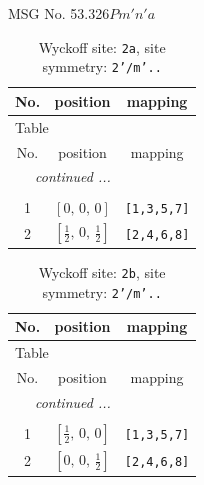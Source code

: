 \documentclass[fleqn,8pt]{jsarticle}
\begin{document}
\setcounter{MaxMatrixCols}{32}

\renewcommand{\tablename}{Table~}
\renewcommand{\figurename}{Figure~}
\begin{center}
\LARGE
MSG No. 53.326\quad$Pm'n'a$
\end{center}
\renewcommand{\arraystretch}{1.2}
\begin{longtable}{ccc}
\caption{Wyckoff site: {\tt 2a}, site symmetry: {\tt 2'/m'..}}
 \\
 \hline \hline
No. & position & mapping \\ \hline \endfirsthead

\multicolumn{2}{l}{\tablename\ \thetable{}} \\
 \hline \hline
No. & position & mapping \\ \hline \endhead

 \hline \hline
\multicolumn{2}{r}{\footnotesize\it continued ...} \\ \endfoot

 \hline \hline
\multicolumn{2}{r}{} \\ \endlastfoot

1 & $\left[ 0,\, 0,\, 0 \right]$ & {\tt [1,3,5,7]} \\ \hline
2 & $\left[ \frac{1}{2},\, 0,\, \frac{1}{2} \right]$ & {\tt [2,4,6,8]} \\
\end{longtable}
\renewcommand{\arraystretch}{1.2}
\begin{longtable}{ccc}
\caption{Wyckoff site: {\tt 2b}, site symmetry: {\tt 2'/m'..}}
 \\
 \hline \hline
No. & position & mapping \\ \hline \endfirsthead

\multicolumn{2}{l}{\tablename\ \thetable{}} \\
 \hline \hline
No. & position & mapping \\ \hline \endhead

 \hline \hline
\multicolumn{2}{r}{\footnotesize\it continued ...} \\ \endfoot

 \hline \hline
\multicolumn{2}{r}{} \\ \endlastfoot

1 & $\left[ \frac{1}{2},\, 0,\, 0 \right]$ & {\tt [1,3,5,7]} \\ \hline
2 & $\left[ 0,\, 0,\, \frac{1}{2} \right]$ & {\tt [2,4,6,8]} \\
\end{longtable}
\renewcommand{\arraystretch}{1.2}
\end{document}

